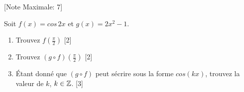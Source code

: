 \begin{question}
  \hspace*{\fill} [Note Maximale: 7]\par
  \medskip
  \noindent Soit $f(x) = cos\,2x$ et $g(x) = 2x^2 - 1$.\par
  \medskip
  \begin{enumerate}[label=\alph*)]
    \item Trouvez $f\left(\frac{\pi}{2}\right)$\hspace*{\fill} [2]
    \item Trouvez $(g \circ f)\left(\frac{\pi}{2}\right)$\hspace*{\fill} [2]
    \item Étant donné que $(g \circ f)$ peut sécrire sous la forme $cos(kx)$, trouvez la valeur de $k$, $k \in \mathbb{Z}$.\hspace*{\fill} [3]
  \end{enumerate}
\end{question}
